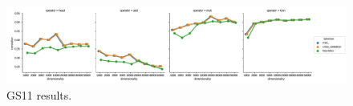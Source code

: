 \begin{figure}[b]
  \centering

    \includegraphics[width=\textwidth]{supplement/figures/gs11-results}
  \caption{GS11 results.}
  \label{fig:gs14-results}
\end{figure}

